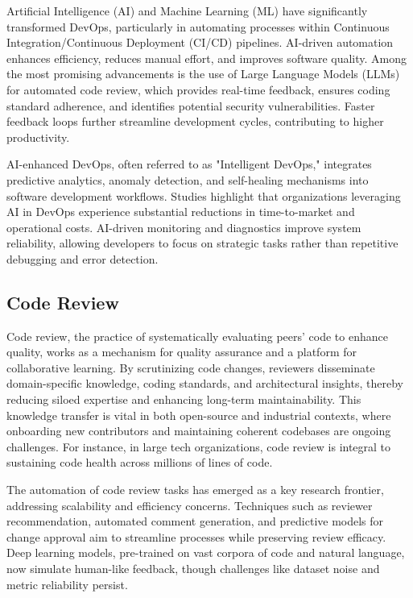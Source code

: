 \documentclass[12pt]{article}
\begin{document}
Artificial Intelligence (AI) and Machine Learning (ML) have significantly transformed DevOps, particularly in automating processes within Continuous Integration/Continuous Deployment (CI/CD) pipelines. AI-driven automation enhances efficiency, reduces manual effort, and improves software quality. Among the most promising advancements is the use of Large Language Models (LLMs) for automated code review, which provides real-time feedback, ensures coding standard adherence, and identifies potential security vulnerabilities. Faster feedback loops further streamline development cycles, contributing to higher productivity. \cite{AIDrivenDevops}

AI-enhanced DevOps, often referred to as "Intelligent DevOps," integrates predictive analytics, anomaly detection, and self-healing mechanisms into software development workflows. Studies highlight that organizations leveraging AI in DevOps experience substantial reductions in time-to-market and operational costs. AI-driven monitoring and diagnostics improve system reliability, allowing developers to focus on strategic tasks rather than repetitive debugging and error detection. \cite{interdisciplinaryAIMLDevopsAutomation}
    
\subsection{Code Review}
Code review, the practice of systematically evaluating peers' code to enhance quality, works as a mechanism for quality assurance and a platform for collaborative learning. By scrutinizing code changes, reviewers disseminate domain-specific knowledge, coding standards, and architectural insights, thereby reducing siloed expertise and enhancing long-term maintainability. This knowledge transfer is vital in both open-source and industrial contexts, where onboarding new contributors and maintaining coherent codebases are ongoing challenges. For instance, in large tech organizations, code review is integral to sustaining code health across millions of lines of code. \cite{codereviewStudy}

The automation of code review tasks has emerged as a key research frontier, addressing scalability and efficiency concerns. Techniques such as reviewer recommendation, automated comment generation, and predictive models for change approval aim to streamline processes while preserving review efficacy. Deep learning models, pre-trained on vast corpora of code and natural language, now simulate human-like feedback, though challenges like dataset noise and metric reliability persist. \cite{codereviewStudy}
\end{document}
